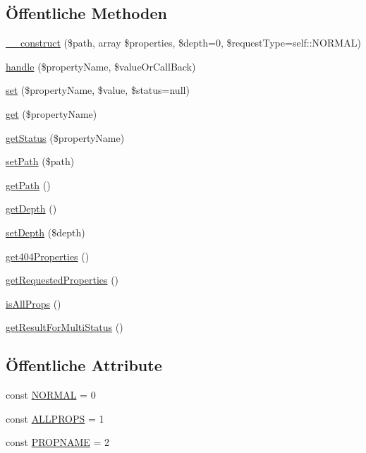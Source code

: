 \subsection*{Öffentliche Methoden}
\begin{DoxyCompactItemize}
\item 
\mbox{\hyperlink{class_sabre_1_1_d_a_v_1_1_prop_find_ad461b10ee0b27a9917bd829e86ce0f10}{\+\_\+\+\_\+construct}} (\$path, array \$properties, \$depth=0, \$request\+Type=self\+::\+N\+O\+R\+M\+AL)
\item 
\mbox{\hyperlink{class_sabre_1_1_d_a_v_1_1_prop_find_acba692c28b8107eca22537593e7c40de}{handle}} (\$property\+Name, \$value\+Or\+Call\+Back)
\item 
\mbox{\hyperlink{class_sabre_1_1_d_a_v_1_1_prop_find_a00b65adb1bab015c7f65ba6d8eb0a77e}{set}} (\$property\+Name, \$value, \$status=null)
\item 
\mbox{\hyperlink{class_sabre_1_1_d_a_v_1_1_prop_find_a2e91ba8e8cbcc28e0c91b0f361a39d91}{get}} (\$property\+Name)
\item 
\mbox{\hyperlink{class_sabre_1_1_d_a_v_1_1_prop_find_aa2929597232fb32b047faf4cb7cce979}{get\+Status}} (\$property\+Name)
\item 
\mbox{\hyperlink{class_sabre_1_1_d_a_v_1_1_prop_find_a6dd85a17baba68a78e237d2d0611ff10}{set\+Path}} (\$path)
\item 
\mbox{\hyperlink{class_sabre_1_1_d_a_v_1_1_prop_find_a6a2464aa10192f6ede120ff6fda2f0a3}{get\+Path}} ()
\item 
\mbox{\hyperlink{class_sabre_1_1_d_a_v_1_1_prop_find_a2e46b579dac1d57f86a48d6bd8d51ce6}{get\+Depth}} ()
\item 
\mbox{\hyperlink{class_sabre_1_1_d_a_v_1_1_prop_find_a860aeb1c9fc0de6891c5388edb17d138}{set\+Depth}} (\$depth)
\item 
\mbox{\hyperlink{class_sabre_1_1_d_a_v_1_1_prop_find_a61810aa4acb7b64c4a75447b018e83f7}{get404\+Properties}} ()
\item 
\mbox{\hyperlink{class_sabre_1_1_d_a_v_1_1_prop_find_ae77234fd2b849cc854b5621441263571}{get\+Requested\+Properties}} ()
\item 
\mbox{\hyperlink{class_sabre_1_1_d_a_v_1_1_prop_find_a8947ace0bae6303bc2cfd2385a014bb6}{is\+All\+Props}} ()
\item 
\mbox{\hyperlink{class_sabre_1_1_d_a_v_1_1_prop_find_a154a7ef5fb583a1ecdc6f52bc7fd4290}{get\+Result\+For\+Multi\+Status}} ()
\end{DoxyCompactItemize}
\subsection*{Öffentliche Attribute}
\begin{DoxyCompactItemize}
\item 
const \mbox{\hyperlink{class_sabre_1_1_d_a_v_1_1_prop_find_a4a2799e72f47c5f9fe8b28abfb5d71db}{N\+O\+R\+M\+AL}} = 0
\item 
const \mbox{\hyperlink{class_sabre_1_1_d_a_v_1_1_prop_find_a5cbeaf341546e9adb42c9ea2c343460f}{A\+L\+L\+P\+R\+O\+PS}} = 1
\item 
const \mbox{\hyperlink{class_sabre_1_1_d_a_v_1_1_prop_find_a1572cd88d1a8e57d522206896d75a400}{P\+R\+O\+P\+N\+A\+ME}} = 2
\end{DoxyCompactItemize}
